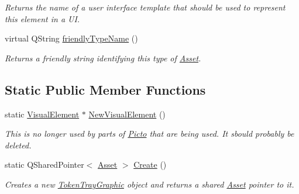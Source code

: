 \begin{DoxyCompactItemize}
\begin{DoxyCompactList}\small\item\em Returns the name of a user interface template that should be used to represent this element in a U\-I. \end{DoxyCompactList}\item 
virtual Q\-String \hyperlink{class_picto_1_1_token_tray_graphic_a48b88c6744dd1dde8e92a588b984df1a}{friendly\-Type\-Name} ()
\begin{DoxyCompactList}\small\item\em Returns a friendly string identifying this type of \hyperlink{class_picto_1_1_asset}{Asset}. \end{DoxyCompactList}\end{DoxyCompactItemize}
\subsection*{Static Public Member Functions}
\begin{DoxyCompactItemize}
\item 
\hypertarget{class_picto_1_1_token_tray_graphic_ad51d48972ec87c3cb0458d230f5e8e48}{static \hyperlink{struct_picto_1_1_visual_element}{Visual\-Element} $\ast$ \hyperlink{class_picto_1_1_token_tray_graphic_ad51d48972ec87c3cb0458d230f5e8e48}{New\-Visual\-Element} ()}\label{class_picto_1_1_token_tray_graphic_ad51d48972ec87c3cb0458d230f5e8e48}

\begin{DoxyCompactList}\small\item\em This is no longer used by parts of \hyperlink{namespace_picto}{Picto} that are being used. It sbould probably be deleted. \end{DoxyCompactList}\item 
\hypertarget{class_picto_1_1_token_tray_graphic_af00c3a070afadda8438356a966929d1d}{static Q\-Shared\-Pointer$<$ \hyperlink{class_picto_1_1_asset}{Asset} $>$ \hyperlink{class_picto_1_1_token_tray_graphic_af00c3a070afadda8438356a966929d1d}{Create} ()}\label{class_picto_1_1_token_tray_graphic_af00c3a070afadda8438356a966929d1d}

\begin{DoxyCompactList}\small\item\em Creates a new \hyperlink{class_picto_1_1_token_tray_graphic}{Token\-Tray\-Graphic} object and returns a shared \hyperlink{class_picto_1_1_asset}{Asset} pointer to it. \end{DoxyCompactList}\end{DoxyCompactItemize}
